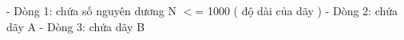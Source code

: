 - Dòng 1: chứa số nguyên dương N $<$= 1000 ( độ dài của dãy )
 - Dòng 2: chứa dãy A
 - Dòng 3: chứa dãy B
